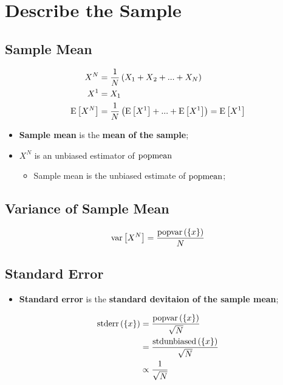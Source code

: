 \section{Describe the Sample}

  \subsection{Sample Mean}
  
    \begin{align}
      X^{N} &= \frac{1}{N} \left( X_{1} + X{_2} + ... + X_{N} \right) \\
      X^{1} &= X_{1} \\
      \operatorname{E}\left[ X^{N} \right] &= \frac{1}{N} \left( \operatorname{E}\left[ X^{1} \right] + ... + \operatorname{E}\left[ X^{1} \right] \right)= \operatorname{E}\left[ X^{1} \right] \\
    \end{align}
  
    \begin{itemize}
      \item \textbf{Sample mean} is the \textbf{mean of the sample};
      \item $ X^{N} $ is an unbiased estimator of $ \operatorname{popmean} $
      \begin{itemize}
        \item Sample mean is the unbiased estimate of $ \operatorname{popmean} $;
      \end{itemize}
    \end{itemize}
    
  \subsection{Variance of Sample Mean}
  
    \begin{equation}
      \operatorname{var}\left[ X^{N} \right] = \frac{ \operatorname{popvar}\left( \{ x \} \right) }{N}
    \end{equation}
    
  \subsection{Standard Error}
  
    \begin{itemize}
      \item \textbf{Standard error} is the \textbf{standard devitaion of the sample mean};
    \end{itemize}
  
    \begin{align}
      \operatorname{stderr}\left( \{ x \} \right) &= \frac{ \operatorname{popvar}\left( \{ x \} \right) }{\sqrt{N}} \\
      &= \frac{ \operatorname{stdunbiased}\left( \{ x \} \right) }{\sqrt{N}} \\
      &\propto \frac{1}{\sqrt{N}}
    \end{align}
    
